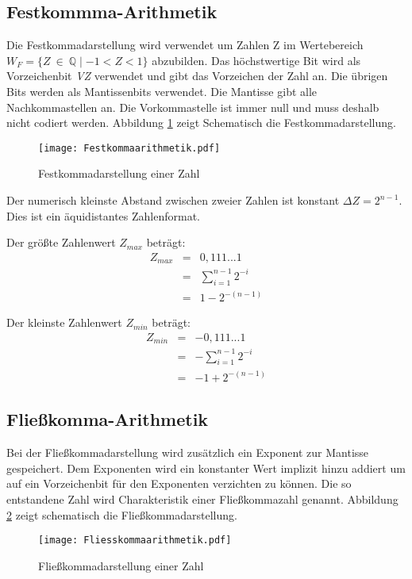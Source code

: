 \subsection{Festkommma-Arithmetik}
Die Festkommadarstellung wird verwendet um Zahlen Z im Wertebereich $W_F = \{ Z~\in~\mathbb{Q} \mid -1 < Z < 1\}$ abzubilden. Das höchstwertige Bit wird als Vorzeichenbit \textit{VZ} verwendet und gibt das Vorzeichen der Zahl an. Die übrigen Bits werden als Mantissenbits verwendet. Die Mantisse gibt alle Nachkommastellen an. Die Vorkommastelle ist immer null und muss deshalb nicht codiert werden. Abbildung \ref{Festkommadarstellung} zeigt Schematisch die Festkommadarstellung.

\begin{figure}[htbp] %
	\centering
	\texttt{[image: Festkommaarithmetik.pdf]}
	\caption{Festkommadarstellung einer Zahl}
	\label{Festkommadarstellung}
\end{figure}

Der numerisch kleinste Abstand zwischen zweier Zahlen ist konstant $\Delta Z = 2^{n-1}$. Dies ist ein äquidistantes Zahlenformat.

Der größte Zahlenwert $Z_{max}$ beträgt:
\begin{eqnarray*}
Z_{max} &=& 0,111...1              \\
        &=& \sum_{i=1}^{n-1}2^{-i} \\
        &=& 1 - 2^{-(n-1)}
\end{eqnarray*}

Der kleinste Zahlenwert $Z_{min}$ beträgt:
\begin{eqnarray*}
Z_{min} &=& -0,111...1              \\
        &=& -\sum_{i=1}^{n-1}2^{-i} \\
        &=& -1 + 2^{-(n-1)}
\end{eqnarray*}

\subsection{Fließkomma-Arithmetik}
Bei der Fließkommadarstellung wird zusätzlich ein Exponent zur Mantisse  gespeichert. Dem Exponenten wird ein konstanter Wert implizit hinzu addiert um auf ein Vorzeichenbit für den Exponenten verzichten zu können. Die so entstandene Zahl wird Charakteristik einer Fließkommazahl genannt. Abbildung \ref{Fliesskommadarstellung} zeigt schematisch die Fließkommadarstellung.
\begin{figure}[htbp] %
	\centering
	\texttt{[image: Fliesskommaarithmetik.pdf]}
	\caption{Fließkommadarstellung einer Zahl}
	\label{Fliesskommadarstellung}
\end{figure}

